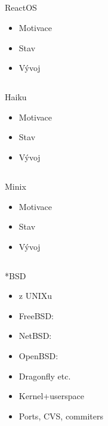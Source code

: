 \documentclass{beamer}
\begin{document}
\subsection{}
\begin{frame}{ReactOS}
\begin{itemize}
\item Motivace
\item Stav
\item Vývoj
\end{itemize}
\end{frame}

\subsection{}
\begin{frame}{Haiku}
\begin{itemize}
\item Motivace
\item Stav
\item Vývoj
\end{itemize}
\end{frame}

\subsection{}
\begin{frame}{Minix}
\begin{itemize}
\item Motivace
\item Stav
\item Vývoj
\end{itemize}
\end{frame}

\subsection{}
\begin{frame}{*BSD}
\begin{itemize}
\item z UNIXu
\item FreeBSD:
\item NetBSD:
\item OpenBSD:
\item Dragonfly etc.
\item Kernel+userspace
\item Ports, CVS, commiters
\end{itemize}
\end{frame}
\end{document}
